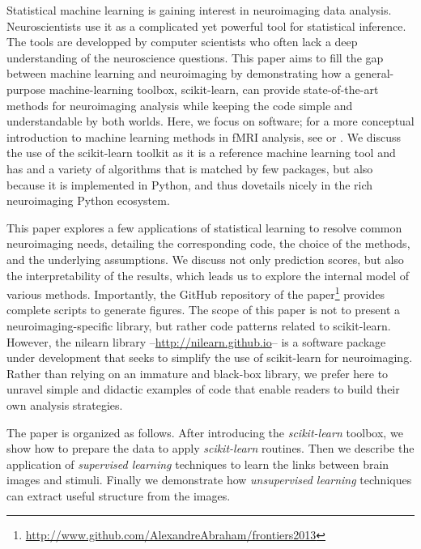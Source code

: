 \documentclass{frontiersSCNS} %
\begin{document}
Statistical machine learning is gaining interest in
neuroimaging data analysis. Neuroscientists use it as a complicated
yet powerful tool for statistical inference. The tools are developped by
computer scientists who often lack a deep understanding of the
neuroscience questions. This paper
aims to fill the gap between machine learning and neuroimaging by demonstrating
how a general-purpose machine-learning toolbox, scikit-learn, can
provide state-of-the-art methods for neuroimaging analysis while keeping
the code simple and
understandable by both worlds. Here, we focus on software; for a 
more conceptual introduction to machine learning methods in fMRI analysis,
see \cite{pereira2009} or \cite{mur2009}.
We discuss the use of the scikit-learn toolkit as it is a reference
machine learning tool and has and a variety of algorithms that is matched by few
packages,
but also because it is implemented in Python,
and thus dovetails nicely in the rich neuroimaging Python ecosystem.

This paper explores a few applications of statistical learning to
resolve common neuroimaging needs, detailing the corresponding code,
the choice of the methods, and the underlying assumptions. We discuss not only
prediction scores, but also the interpretability of the results, which
leads us to explore the internal model of various methods. 
Importantly, the GitHub repository of the
paper\footnote{\url{http://www.github.com/AlexandreAbraham/frontiers2013}}
provides complete scripts to generate figures. 
The scope of this paper is not to present a neuroimaging-specific library,
but rather
code patterns related to scikit-learn. However, the nilearn library --\url{http://nilearn.github.io}-- is a software
package under development
that seeks to simplify the use of scikit-learn for neuroimaging. Rather
than relying on an immature and black-box library, we prefer here to
unravel simple and didactic examples of code that enable readers to
build their own analysis strategies.

The paper is organized as
follows. After introducing the \emph{scikit-learn} toolbox, we show 
how to prepare the data to apply
\emph{scikit-learn} routines. Then we describe the application of \emph{supervised
learning} techniques to learn the links between brain images and
stimuli. Finally we demonstrate how \emph{unsupervised learning}
techniques can extract useful structure from the images.

\end{document}
